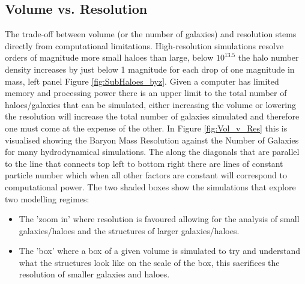 \subsection{Volume vs. Resolution}
The trade-off between volume (or the number of galaxies) and resolution stems directly from computational limitations. High-resolution simulations resolve orders of magnitude more small haloes than large, below $10^13.5$ the halo number density increases by just below 1 magnitude for each drop of one magnitude in mass, left panel Figure \ref{fig:SubHaloes_byz}. Given a computer has limited memory and processing power there is an upper limit to the total number of haloes/galaxies that can be simulated, either increasing the volume or lowering the resolution will increase the total number of galaxies simulated and therefore one must come at the expense of the other. In Figure \ref{fig:Vol_v_Res} this is visualised showing the Baryon Mass Resolution against the Number of Galaxies for many hydrodynamical simulations. The along the diagonals that are parallel to the line that connects top left to bottom right there are lines of constant particle number which when all other factors are constant will correspond to computational power. The two shaded boxes show the simulations that explore two modelling regimes:
\begin{itemize}
    \item The 'zoom in' where resolution is favoured allowing for the analysis of small galaxies/haloes and the structures of larger galaxies/haloes.
    \item The 'box' where a box of a given volume is simulated to try and understand what the structures look like on the scale of the box, this sacrifices the resolution of smaller galaxies and haloes.
\end{itemize}

